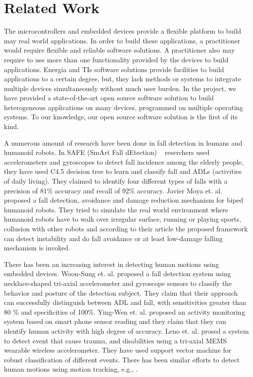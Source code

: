 \documentclass[letterpaper]{article}
\begin{document}
\section{Related Work}

The microcontrollers and embedded devices provide a flexible platform to build may real world
applications. In order to build these applications, a practitioner would require  flexible and
reliable software solutions. A practitioner also may require to use more than one functionality
provided by the devices to build applications. Energia and TIs software solutions provide
facilities to build applications to a certain degree, but, they lack methods or systems to integrate
multiple devices simultaneously without much user burden. In the project, we have provided a
state-of-the-art open source software solution to build heterogeneous applications on many devices,
programmed on multiple operating systems. To our knowledge, our open source software solution is the
first of its kind. 

A numerous amount of research have been done in fall detection in humans and humanoid robots. 
In SAFE (SmArt Fall dEtection) {~\cite{ojetola2011fall}} reserchers used accelerometers and gyroscopes 
to detect fall incidence among the elderly people, they have used C4.5 decision tree to learn and classify fall and ADLs (activities of daily living). They claimed to identify four different types of falls with a precision of 81\% accuracy and recall of 92\% accuracy.
Javier Moya et. al.{~\cite{moya2014fall}} proposed a fall detection, avoidance and damage reduction mechanism for biped humanoid robots. They tried to simulate the real world environment where humanoid robots have to walk over irregular surface, running or playing sports, collusion with other robots and according to their article the proposed framework can detect instability and do fall avoidance or at least low-damage falling mechanism is invoked. 

There has been an increasing interest in detecting human motions using embedded devices. Woon-Sung
et. al. \cite{baek2013real} proposed  a fall  detection  system  using necklace-shaped tri-axial
accelerometer  and  gyroscope  sensors  to  classify  the  behavior  and  posture  of  the detection
 subject. They claim that their  approach  can  successfully  distinguish between  ADL and  fall, 
with  sensitivities  greater  than  80 \%  and specificities  of  100\%. Ying-Wen et. al.
\cite{bai2013recognition} proposed an activity monitoring system based on smart phone sensor
reading and they claim that they can identify human activity with high degree of accuracy. Leno et.
al. \cite{leone2013supervised} prosed a system to detect event that cause trauma, and disabilities
using a tri-axial MEMS wearable wireless accelerometer. They have used support vector machine for
robust classification of different events. There has been similar efforts to detect human motions
using motion tracking, e.g., \cite{dumitrache2013fall,kumarwearable,liang2012pre}.
\end{document}
